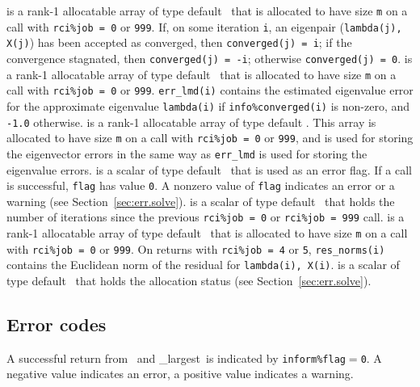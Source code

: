 \begin{description}
%
 is a rank-1 allocatable array of type 
default \Integer\ that is allocated to have size {\tt m} 
on a call with {\tt rci\%job = 0} or {\tt 999}.
If, on some iteration {\tt i}, an eigenpair ({\tt lambda(j), X(j)})
has been accepted as converged, then {\tt converged(j) = i}; 
if the convergence stagnated, then {\tt converged(j) = -i}; 
otherwise {\tt converged(j) = 0}.
%
%
 is a rank-1 allocatable array of type 
default \Double\ that is allocated to have size {\tt m} 
on a call with {\tt rci\%job = 0} or {\tt 999}.
{\tt err\_lmd(i)} contains 
the estimated eigenvalue error
for the approximate eigenvalue {\tt lambda(i)}
if {\tt info\%converged(i)} is non-zero,
and {\tt -1.0} otherwise.
%
 is a rank-1 allocatable array of type default \Double.
This array is allocated to have size {\tt m} 
on a call with {\tt rci\%job = 0} or {\tt 999},
and is used for storing the eigenvector errors
in the same way as {\tt err\_lmd} is used
for storing the eigenvalue errors.
%
 is a scalar of type default \Integer\ 
that is used as an error flag.
If a call is successful, {\tt flag} has value {\tt 0}.
A nonzero value of {\tt flag} indicates an error or a warning
(see Section~\ref{sec:err.solve}).
%
 is a scalar of type default \Integer\
that holds the number of iterations 
since the previous {\tt rci\%job = 0} or {\tt rci\%job = 999} call.
%
\itt{residual\_norms} is a rank-1 allocatable array of type
default \Double\ that is allocated to have size {\tt m} 
on a call with {\tt rci\%job = 0} or {\tt 999}.
On returns with 
{\tt rci\%job = 4} or {\tt 5}, {\tt res\_norms(i)} 
contains the Euclidean norm of the residual
for {\tt lambda(i), X(i)}.
%
is a scalar of type default \Integer\ 
that holds the allocation status
(see Section~\ref{sec:err.solve}).
%
\end{description}

\subsection{Error codes}

\label{sec:err}

A successful return from 
\solver\ and
\solver\_largest\
is indicated 
by {\tt inform\%flag$=$0}.
A negative value indicates an error, a positive value indicates a warning.

